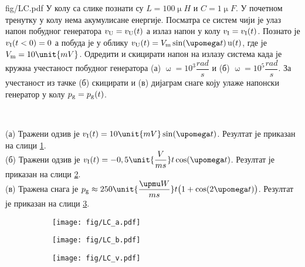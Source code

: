 \mnDifficult
\begin{slikaDesno}{fig/LC.pdf}
\PID  У колу са слике познати су 
$L = 100\unit{\upmu H}$ и $C = 1\unit{\upmu F}$.
У почетном тренутку у колу нема 
акумулисане енергије. Посматра
се систем чији је улаз напон побудног генератора $v_{\rm U} = v_{\rm U}(t)$ а излаз напон у колу 
$v_{\rm I} = v_{\rm I}(t)$. 
Познато је $v_{\rm I}(t < 0) = 0$ а побуда
је у облику $v_{\rm U}(t) = V_{\rm m} 
\sin(\upomega t)\,{\rm u}(t)$, где је 
$V_{\rm m} = 10\unit{mV}$. Одредити 
и скицирати напон на 
излазу система када је кружна учестаност 
побудног генератора (а) $\upomega = 10^3 
\unit{\dfrac{rad}{s}}$ и (б) 
$\upomega = 10^5 
\unit{\dfrac{rad}{s}}$. За учестаност из 
тачке (б) скицирати и (в) дијаграм снаге 
коју улаже напонски генератор у колу
$p_{\rm g} =p_{\rm g}(t)$.
\end{slikaDesno}\\

\REZULTAT 

(а) Тражени одзив је $v_{\rm I}(t) = 10\unit{mV} \sin(\upomega t)$. 
Резултат је приказан на слици \ref{fig:\ID.a}.\\[2mm]

(б) Тражени одзив је $v_{\rm I}(t) = -0,5\unit{\dfrac{V}{ms}} t \cos(\upomega t)$.
Резултат је приказан на слици \ref{fig:\ID.b}.\\[2mm]

(в) Тражена снага је $p_{\rm g} \approx 250\unit{\dfrac{\upmu W}{ms}} t
\bigl(1 + \cos(2\upomega t) \bigr)$.
Резултат је приказан на слици \ref{fig:\ID.v}. \\

\noindent
\begin{figure}[ht!]
    \hspace*{0pt}%
    \begin{subfigure}[b]{0.32\textwidth}
        \texttt{[image: fig/LC\_a.pdf]}
        \caption{}
        \label{fig:\ID.a}
    \end{subfigure}
    \begin{subfigure}[b]{0.32\textwidth}
        \texttt{[image: fig/LC\_b.pdf]}
        \caption{}
        \label{fig:\ID.b}
    \end{subfigure}
    \begin{subfigure}[b]{0.32\textwidth}
        \texttt{[image: fig/LC\_v.pdf]}
        \caption{}
        \label{fig:\ID.v}
    \end{subfigure}
    \caption{}
    \label{fig:\ID.2}
\end{figure}



